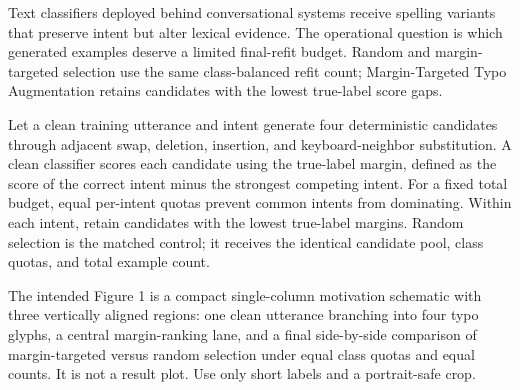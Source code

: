 Text classifiers deployed behind conversational systems receive spelling variants that preserve intent but alter lexical evidence. The operational question is which generated examples deserve a limited final-refit budget. Random and margin-targeted selection use the same class-balanced refit count; Margin-Targeted Typo Augmentation retains candidates with the lowest true-label score gaps.

Let a clean training utterance and intent generate four deterministic candidates through adjacent swap, deletion, insertion, and keyboard-neighbor substitution. A clean classifier scores each candidate using the true-label margin, defined as the score of the correct intent minus the strongest competing intent. For a fixed total budget, equal per-intent quotas prevent common intents from dominating. Within each intent, retain candidates with the lowest true-label margins. Random selection is the matched control; it receives the identical candidate pool, class quotas, and total example count.

The intended Figure 1 is a compact single-column motivation schematic with three vertically aligned regions: one clean utterance branching into four typo glyphs, a central margin-ranking lane, and a final side-by-side comparison of margin-targeted versus random selection under equal class quotas and equal counts. It is not a result plot. Use only short labels and a portrait-safe crop.
